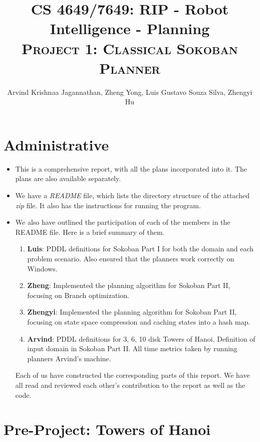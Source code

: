 \documentclass[10pt, letter]{article}
\newcommand{\doctitle}{%
CS 4649/7649: RIP - Robot Intelligence - Planning}
\begin{document}
\title{\textbf{\doctitle} \\\textsc{Project 1: Classical Sokoban Planner}}
  \author {Arvind Krishnaa Jagannathan, Zheng Yong, Luis Gustavo Souza Silva, Zhengyi Hu}%
   \date{}
\maketitle

\section{Administrative}
\begin{itemize}
	\item This is a comprehensive report, with all the plans incorporated into it. The plans are also available separately.
	\item We have a \textit{README} file, which lists the directory structure of the attached \textit{zip} file. It also has the instructions for running the program.
	\item We also have outlined the participation of each of the members in the README file. Here is a brief summary of them.
		\begin{enumerate}
			\item \textbf{Luis}: PDDL definitions for Sokoban Part I for both the domain and each problem scenario. Also ensured that the planners work correctly on Windows.
			\item \textbf{Zheng}: Implemented the planning algorithm for Sokoban Part II, focusing on Branch optimization.
			\item \textbf{Zhengyi}: Implemented the planning algorithm for Sokoban Part II, focusing on state space compression and caching states into a hash map.
			\item \textbf{Arvind}: PDDL definitions for 3, 6, 10 disk Towers of Hanoi. Definition of input domain in Sokoban Part II. All time metrics taken by running planners Arvind's machine.
		\end{enumerate}
	Each of us have constructed the corresponding parts of this report. We have all read and reviewed each other's contribution to the report as well as the code.
\end{itemize}

\section{Pre-Project: Towers of Hanoi}
\end{document}
